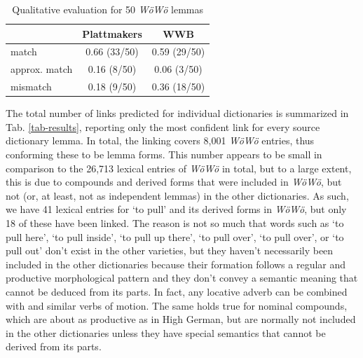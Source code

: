 \begin{table}
        \centering
        {\small 
        \begin{tabular}{lcc}
        & Plattmakers           & WWB \\\hline
        match                   & 0.66 (33/50) & 0.59 (29/50) \\
        approx. match     & 0.16 (8/50) & 0.06 (3/50) \\
        mismatch                & 0.18 (9/50) & 0.36 (18/50) \\
    \end{tabular}
    } %
    \caption{Qualitative evaluation for 50 \emph{WöWö} lemmas}
    \label{tab-eval}
\end{table}


The total number of links predicted for individual dictionaries is summarized in Tab. \ref{tab-results}, reporting only the most confident link for every source dictionary lemma.
In total, the linking covers 8,001 \emph{WöWö} entries, thus conforming these to be lemma forms. This number appears to be small in comparison to the 26,713 lexical entries of \emph{WöWö} in total, but to a large extent, this is due to compounds and derived forms that were included in \emph{WöWö}, but not (or, at least, not as independent lemmas) in the other dictionaries. As such, we have 41 lexical entries for  `to pull' and its derived forms in \emph{WöWö}, but only 18 of these have been linked. The reason is not so much that words such as  `to pull here',  `to pull inside',  `to pull up there',  `to pull over',  `to pull over', or  `to pull out' don't exist in the other varieties, but they haven't necessarily been included in the other dictionaries because their formation follows a regular and productive morphological pattern and they don't convey a semantic meaning that cannot be deduced from its parts. In fact, any locative adverb can be combined with  and similar verbs of motion. The same holds true for nominal compounds, which are about as productive as in High German, but are normally not included in the other dictionaries unless they have special semantics that cannot be derived from its parts.

